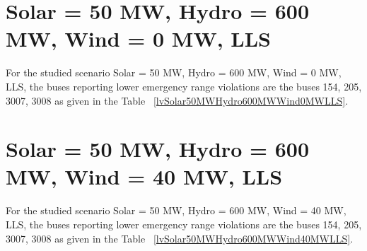 \documentclass[10pt]{report}
\begin{document}
\section{Solar = 50 MW, Hydro = 600 MW, Wind = 0 MW, LLS}
For the studied scenario Solar = 50 MW, Hydro = 600 MW, Wind = 0 MW, LLS, the buses reporting lower emergency range violations are the buses 154, 205, 3007, 3008 as given in the Table ~\ref{lvSolar50MWHydro600MWWind0MWLLS}.
\begin{table}[H]
\caption{Contingencies reporting bus voltages lower than emergency voltage of 1.1 PU for scenario Solar = 50 MW, Hydro = 600 MW, Wind = 0 MW, LLS}
\label{lvSolar50MWHydro600MWWind0MWLLS}
\centering
{}
\end{table}

\section{Solar = 50 MW, Hydro = 600 MW, Wind = 40 MW, LLS}
For the studied scenario Solar = 50 MW, Hydro = 600 MW, Wind = 40 MW, LLS, the buses reporting lower emergency range violations are the buses 154, 205, 3007, 3008 as given in the Table ~\ref{lvSolar50MWHydro600MWWind40MWLLS}.
\begin{table}[H]
\caption{Contingencies reporting bus voltages lower than emergency voltage of 1.1 PU for scenario Solar = 50 MW, Hydro = 600 MW, Wind = 40 MW, LLS}
\label{lvSolar50MWHydro600MWWind40MWLLS}
\centering
{}
\end{table}
\end{document}
